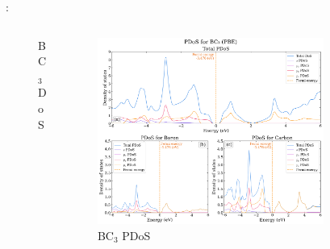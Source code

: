 \documentclass[xcolor=dvipsnames]{beamer}
\begin{document}
\begin{frame}{\insertsection: \insertsubsection}
\begin{columns}
\begin{column}{0.45\textwidth}
\begin{figure}
        \caption{BC$_\text{3}$ DoS}
    \end{figure}\end{column}
    \begin{column}{0.55\textwidth}\begin{figure}
        \includegraphics[width=0.8\textwidth]{PDoS/BC3_pdos.png}
        \caption{BC$_\text{3}$ PDoS}
    \end{figure}\end{column}
\end{columns}
\end{frame}
\end{document}
